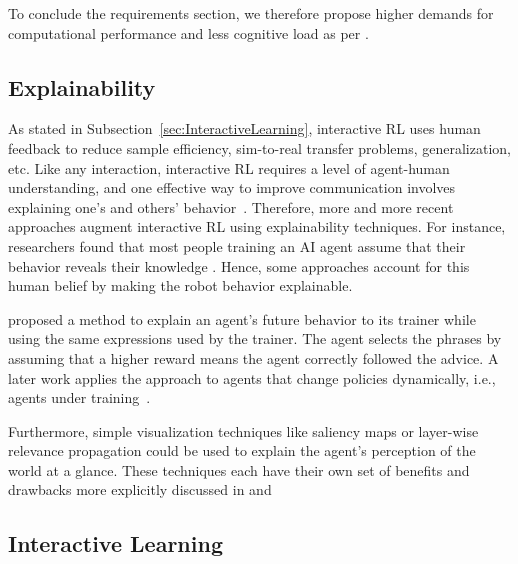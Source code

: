 \documentclass[twoside,11pt]{article}
\begin{document}
\begin{enumerate}
To conclude the requirements section, we therefore propose higher demands for computational performance and less cognitive load as per \citet{milani2022survey}.

\subsection{Explainability}
As stated in Subsection~\ref{sec:InteractiveLearning}, interactive RL uses human feedback to reduce sample efficiency, sim-to-real transfer problems, generalization, etc. Like any interaction, interactive RL requires a level of agent-human understanding, and one effective way to improve communication involves explaining one's and others' behavior~\citep{de:17}. Therefore, more and more recent approaches augment interactive RL using explainability techniques. For instance, researchers found that most people training an AI agent assume that their behavior reveals their knowledge \citep{habibian:21}. Hence, some approaches account for this human belief by making the robot behavior explainable.

\citet{fukuchi2017autonomous} proposed a method to explain an agent's future behavior to its trainer while using the same expressions used by the trainer. The agent selects the phrases by assuming that a higher reward means the agent correctly followed the advice. A later work applies the approach to agents that change policies dynamically, i.e., agents under training~\citep{fukuchi2017application}. 

Furthermore, simple visualization techniques like saliency maps or layer-wise relevance propagation could be used to explain the agent's perception of the world at a glance. These techniques each have their own set of benefits and drawbacks more explicitly discussed in \citet{LiuEtAl:2018:LinearModelUTrees} and \citet{Bach:2015:LayerWiseRelevancePropagation}


\subsection{Interactive Learning}


\end{enumerate}
\end{document}
